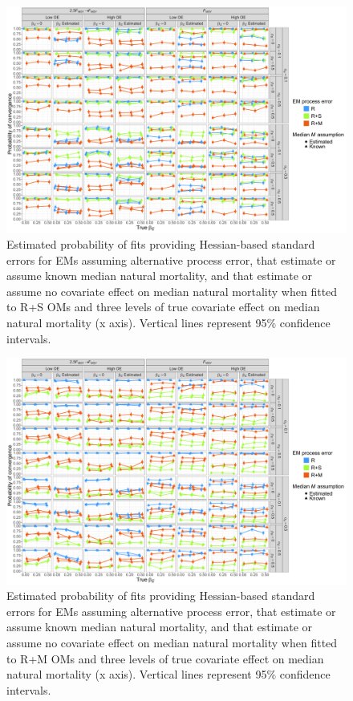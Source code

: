 \documentclass[
  12pt,
]{article}
\begin{document}
\begin{landscape}
\begin{figure}
\begin{center}
\includegraphics{convergence_RSom}
\end{center}
\caption{Estimated probability of fits providing Hessian-based standard errors for EMs assuming alternative process error, that estimate or assume known median natural mortality, and that estimate or assume no covariate effect on median natural mortality when fitted to R+S OMs and three levels of true covariate effect on median natural mortality (x axis). Vertical lines represent 95\% confidence intervals.}\label{convergence_RSom}
\end{figure}
\end{landscape}

\begin{landscape}
\begin{figure}
\begin{center}
\includegraphics{convergence_RMom}
\end{center}
\caption{Estimated probability of fits providing Hessian-based standard errors for EMs assuming alternative process error, that estimate or assume known median natural mortality, and that estimate or assume no covariate effect on median natural mortality when fitted to R+M OMs and three levels of true covariate effect on median natural mortality (x axis). Vertical lines represent 95\% confidence intervals.}\label{convergence_RMom}
\end{figure}
\end{landscape}
\end{document}
